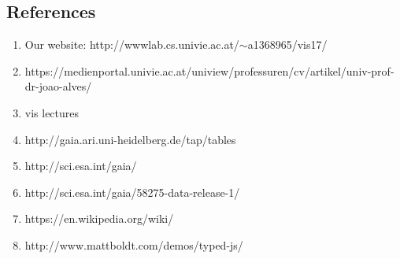 \documentclass{article}
\begin{document}
\subsection {References}
\begin{enumerate}
    \item Our website: http://wwwlab.cs.univie.ac.at/$\sim$a1368965/vis17/

\item https://medienportal.univie.ac.at/uniview/professuren/cv/artikel/univ-prof-dr-joao-alves/
\item vis lectures
\item http://gaia.ari.uni-heidelberg.de/tap/tables
\item http://sci.esa.int/gaia/
\item http://sci.esa.int/gaia/58275-data-release-1/
\item https://en.wikipedia.org/wiki/
\item http://www.mattboldt.com/demos/typed-js/


\end{enumerate}
\end{document}
